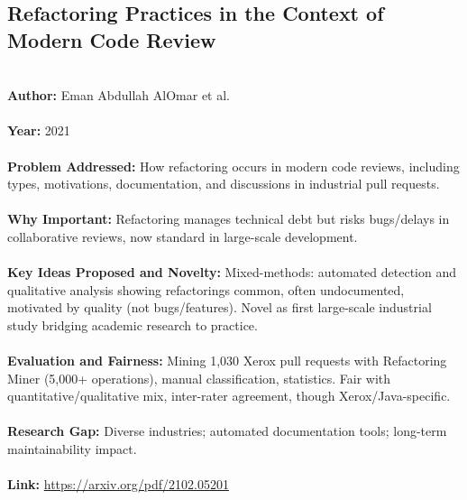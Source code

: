 \documentclass[12pt]{article}
\begin{document}
\subsection*{Refactoring Practices in the Context of Modern Code Review}
\\
\textbf{Author:} Eman Abdullah AlOmar et al. \\
\\
\textbf{Year:} 2021 \\
\\
\textbf{Problem Addressed:} How refactoring occurs in modern code reviews, including types, motivations, documentation, and discussions in industrial pull requests. \\
\\
\textbf{Why Important:} Refactoring manages technical debt but risks bugs/delays in collaborative reviews, now standard in large-scale development. \\
\\
\textbf{Key Ideas Proposed and Novelty:} Mixed-methods: automated detection and qualitative analysis showing refactorings common, often undocumented, motivated by quality (not bugs/features). Novel as first large-scale industrial study bridging academic research to practice. \\
\\
\textbf{Evaluation and Fairness:} Mining 1,030 Xerox pull requests with Refactoring Miner (5,000+ operations), manual classification, statistics. Fair with quantitative/qualitative mix, inter-rater agreement, though Xerox/Java-specific. \\
\\
\textbf{Research Gap:} Diverse industries; automated documentation tools; long-term maintainability impact. \\
\\
\textbf{Link:} \url{https://arxiv.org/pdf/2102.05201}
\pagebreak

\end{document}
